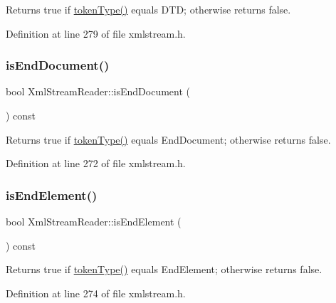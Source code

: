 Returns {\ttfamily true} if \hyperlink{class_xml_stream_reader_a2c26bfb63c27f2992e24f038d65c8c0a}{token\+Type()} equals  D\+TD; otherwise returns {\ttfamily false}. 

Definition at line 279 of file xmlstream.\+h.

\mbox{\label{class_xml_stream_reader_a855b760b7aeec5b7fb177a88d9e7caee}} 
\subsubsection{\texorpdfstring{is\+End\+Document()}{isEndDocument()}}
{\footnotesize\ttfamily bool Xml\+Stream\+Reader\+::is\+End\+Document (\begin{DoxyParamCaption}{ }\end{DoxyParamCaption}) const\hspace{0.3cm}{\ttfamily [inline]}}

Returns {\ttfamily true} if \hyperlink{class_xml_stream_reader_a2c26bfb63c27f2992e24f038d65c8c0a}{token\+Type()} equals  End\+Document; otherwise returns {\ttfamily false}. 

Definition at line 272 of file xmlstream.\+h.

\mbox{\label{class_xml_stream_reader_a4262447470b01b9544d1e83bf9521b35}} 
\subsubsection{\texorpdfstring{is\+End\+Element()}{isEndElement()}}
{\footnotesize\ttfamily bool Xml\+Stream\+Reader\+::is\+End\+Element (\begin{DoxyParamCaption}{ }\end{DoxyParamCaption}) const\hspace{0.3cm}{\ttfamily [inline]}}

Returns {\ttfamily true} if \hyperlink{class_xml_stream_reader_a2c26bfb63c27f2992e24f038d65c8c0a}{token\+Type()} equals  End\+Element; otherwise returns {\ttfamily false}. 

Definition at line 274 of file xmlstream.\+h.


